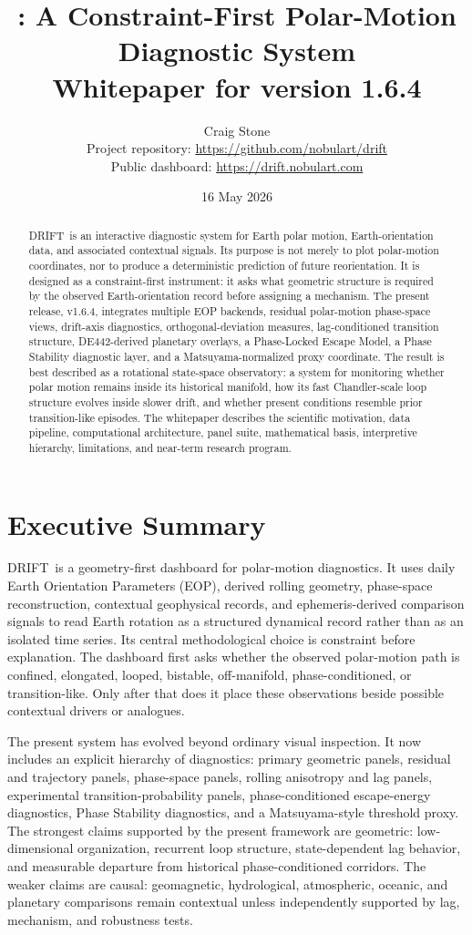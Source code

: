 \documentclass[11pt]{article}
\title{\vspace{-1.5em}\textbf{\DRIFT: A Constraint-First Polar-Motion Diagnostic System}\\\large Whitepaper for version 1.6.4}
\author{Craig Stone\\\small Project repository: \url{https://github.com/nobulart/drift}\\\small Public dashboard: \url{https://drift.nobulart.com}}
\date{16 May 2026}
\newcommand{\DRIFT}{\textsc{DRIFT}}
\begin{document}
\maketitle

\begin{abstract}
\DRIFT\ is an interactive diagnostic system for Earth polar motion, Earth-orientation data, and associated contextual signals. Its purpose is not merely to plot polar-motion coordinates, nor to produce a deterministic prediction of future reorientation. It is designed as a constraint-first instrument: it asks what geometric structure is required by the observed Earth-orientation record before assigning a mechanism. The present release, v1.6.4, integrates multiple EOP backends, residual polar-motion phase-space views, drift-axis diagnostics, orthogonal-deviation measures, lag-conditioned transition structure, DE442-derived planetary overlays, a Phase-Locked Escape Model, a Phase Stability diagnostic layer, and a Matsuyama-normalized proxy coordinate. The result is best described as a rotational state-space observatory: a system for monitoring whether polar motion remains inside its historical manifold, how its fast Chandler-scale loop structure evolves inside slower drift, and whether present conditions resemble prior transition-like episodes. The whitepaper describes the scientific motivation, data pipeline, computational architecture, panel suite, mathematical basis, interpretive hierarchy, limitations, and near-term research program.
\end{abstract}

\section{Executive Summary}
\DRIFT\ is a geometry-first dashboard for polar-motion diagnostics. It uses daily Earth Orientation Parameters (EOP), derived rolling geometry, phase-space reconstruction, contextual geophysical records, and ephemeris-derived comparison signals to read Earth rotation as a structured dynamical record rather than as an isolated time series. Its central methodological choice is constraint before explanation. The dashboard first asks whether the observed polar-motion path is confined, elongated, looped, bistable, off-manifold, phase-conditioned, or transition-like. Only after that does it place these observations beside possible contextual drivers or analogues.

The present system has evolved beyond ordinary visual inspection. It now includes an explicit hierarchy of diagnostics: primary geometric panels, residual and trajectory panels, phase-space panels, rolling anisotropy and lag panels, experimental transition-probability panels, phase-conditioned escape-energy diagnostics, Phase Stability diagnostics, and a Matsuyama-style threshold proxy. The strongest claims supported by the present framework are geometric: low-dimensional organization, recurrent loop structure, state-dependent lag behavior, and measurable departure from historical phase-conditioned corridors. The weaker claims are causal: geomagnetic, hydrological, atmospheric, oceanic, and planetary comparisons remain contextual unless independently supported by lag, mechanism, and robustness tests.
\end{document}
